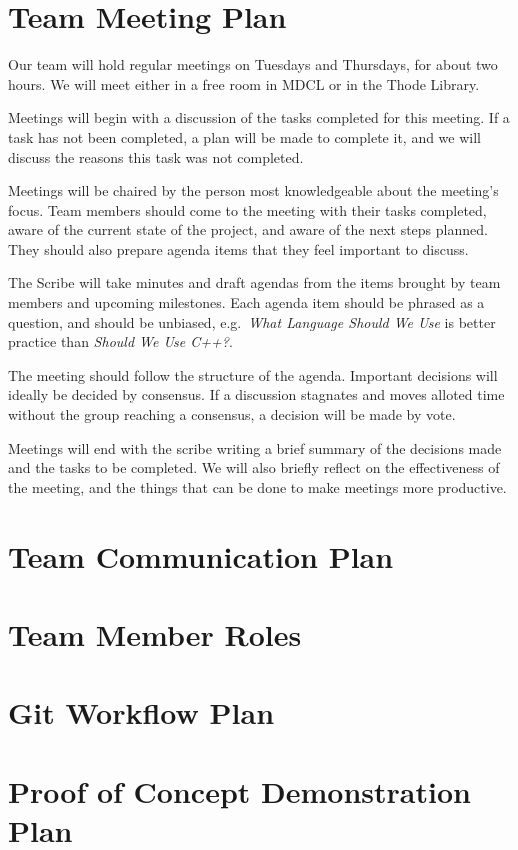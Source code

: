 \documentclass{article}
\begin{document}
\section{Team Meeting Plan} %
Our team will hold regular meetings on Tuesdays and Thursdays, for about two hours. We will meet either in a free room in MDCL or in the Thode Library.

Meetings will begin with a discussion of the tasks completed for this meeting. If a task has not been completed, a plan will be made to complete it, and we will discuss the reasons this task was not completed.

  Meetings will be chaired by the person most knowledgeable about the meeting's focus. Team members should come to the meeting with their tasks completed, aware of the current state of the project, and aware of the next steps planned. They should also prepare agenda items that they feel important to discuss. 

  The Scribe will take minutes and draft agendas from the items brought by team members and upcoming milestones. Each agenda item should be phrased as a question, and should be unbiased, e.g.\ \textit{What Language Should We Use} is better practice than \textit{Should We Use C++?}.

  The meeting should follow the structure of the agenda. Important decisions will ideally be decided by consensus. If a discussion stagnates and moves alloted time without the group reaching a consensus, a decision will be made by vote.
  
  Meetings will end with the scribe writing a brief summary of the decisions made and the tasks to be completed. We will also briefly reflect on the effectiveness of the meeting, and the things that can be done to make meetings more productive.
\section{Team Communication Plan} %

\section{Team Member Roles} %

\section{Git Workflow Plan}

\section{Proof of Concept Demonstration Plan} %
\end{document}

